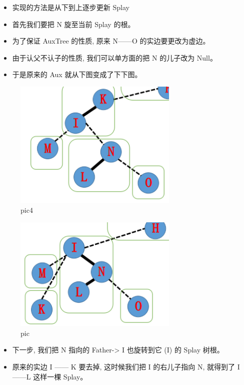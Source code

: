 \begin{itemize}
\item 实现的方法是从下到上逐步更新 Splay
\item 首先我们要把 N 旋至当前 Splay 的根。
\item 为了保证 AuxTree 的性质, 原来 N——O 的实边要更改为虚边。
\item 由于认父不认子的性质, 我们可以单方面的把 N 的儿子改为 Null。
\item 于是原来的 Aux 就从下图变成了下下图。
\end{itemize}

\begin{figure}[htbp]
\centering
\includegraphics[width=0.7\textwidth]{docs/ds/images/lct4.png} 
\caption{pic4}
\end{figure}

\begin{figure}[htbp]
\centering
\includegraphics[width=0.7\textwidth]{docs/ds/images/lct5.png} 
\caption{pic}
\end{figure}

\begin{itemize}
\item 下一步, 我们把 N 指向的 Father-> I 也旋转到它 (I) 的 Splay 树根。
\item 原来的实边 I —— K 要去掉, 这时候我们把 I 的右儿子指向 N, 就得到了 I——L 这样一棵 Splay。
\end{itemize}

